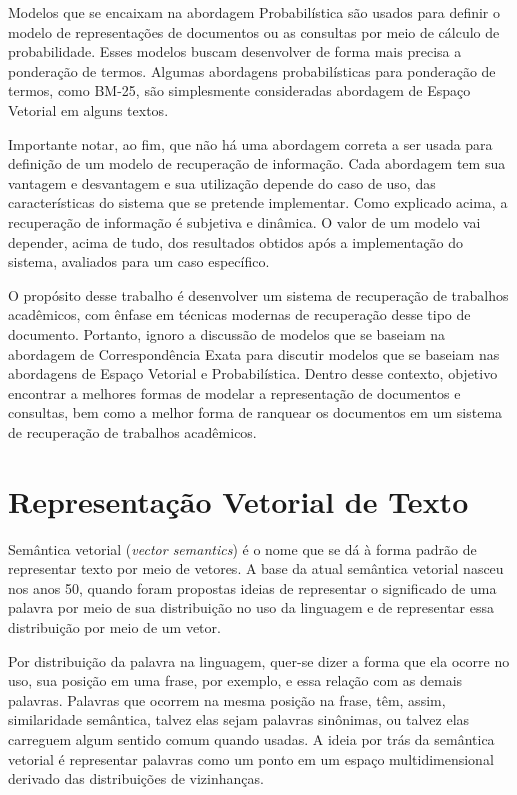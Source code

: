\documentclass[
	12pt,				%
	openright,			%
	oneside,			%
	a4paper,			%
	english,			%
	french,				%
	spanish,			%
	brazil				%
	]{abntex2}
\begin{document}
Modelos que se encaixam na abordagem Probabilística são usados para definir o modelo de representações de documentos ou
as consultas por meio de cálculo de probabilidade.
Esses modelos buscam desenvolver de forma mais precisa a ponderação de termos. \cite{Hiemstra2009}
Algumas abordagens probabilísticas para ponderação de termos, como BM-25, são simplesmente consideradas abordagem de
Espaço Vetorial em alguns textos.

Importante notar, ao fim, que não há uma abordagem correta a ser usada para definição de um modelo de recuperação
de informação.
Cada abordagem tem sua vantagem e desvantagem e sua utilização depende do caso de uso, das características do sistema
que se pretende implementar.
Como explicado acima, a recuperação de informação é subjetiva e dinâmica.
O valor de um modelo vai depender, acima de tudo, dos resultados obtidos após a implementação do sistema,
avaliados para um caso específico.

O propósito desse trabalho é desenvolver um sistema de recuperação de trabalhos acadêmicos, com ênfase em técnicas modernas
de recuperação desse tipo de documento.
Portanto, ignoro a discussão de modelos que se baseiam na abordagem de Correspondência Exata para discutir modelos que se
baseiam nas abordagens de Espaço Vetorial e Probabilística.
Dentro desse contexto, objetivo encontrar a melhores formas de modelar a representação de documentos e consultas, bem
como a melhor forma de ranquear os documentos em um sistema de recuperação de trabalhos acadêmicos.

\section{Representação Vetorial de Texto}\label{sec:representacao-vetorial-de-texto}

Semântica vetorial (\textit{vector semantics}) é o nome que se dá à forma padrão de representar texto por meio de vetores.
A base da atual semântica vetorial nasceu nos anos 50, quando foram propostas ideias de representar
o significado de uma palavra por meio de sua distribuição no uso da linguagem e de representar essa distribuição por
meio de um vetor.

Por distribuição da palavra na linguagem, quer-se dizer a forma que ela ocorre no uso, sua posição
em uma frase, por exemplo, e essa relação com as demais palavras.
Palavras que ocorrem na mesma posição na frase, têm, assim,
similaridade semântica, talvez elas sejam palavras sinônimas, ou talvez elas carreguem algum sentido comum quando
usadas.
A ideia por trás da semântica vetorial é representar palavras como um ponto em um espaço multidimensional
derivado das distribuições de vizinhanças.
\cite{JurafskyMartin2023}
\end{document}
